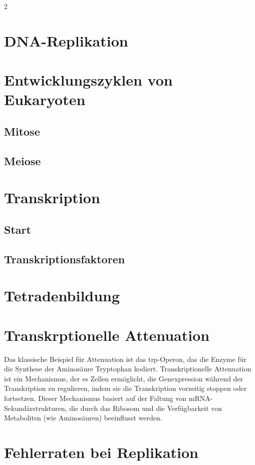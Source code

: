 \documentclass{article}
\begin{document}
\begin{multicols}{2}
\section{DNA-Replikation}
\section{Entwicklungszyklen von Eukaryoten}
\subsection{Mitose}
\subsection{Meiose}

\section{Transkription}
\subsection{Start}
\subsection{Transkriptionsfaktoren}

\section{Tetradenbildung}

\section{Transkrptionelle Attenuation}
Das klassische Beispiel für Attenuation ist das trp-Operon, das die Enzyme für die Synthese der Aminosäure Tryptophan kodiert. \newline
Transkriptionelle Attenuation ist ein Mechanismus, der es Zellen ermöglicht, die Genexpression während der Transkription zu regulieren, indem sie die Transkription vorzeitig stoppen oder fortsetzen. Dieser Mechanismus basiert auf der Faltung von mRNA-Sekundärstrukturen, die durch das Ribosom und die Verfügbarkeit von Metaboliten (wie Aminosäuren) beeinflusst werden.

\section{Fehlerraten bei Replikation}


\end{multicols}
\end{document}
